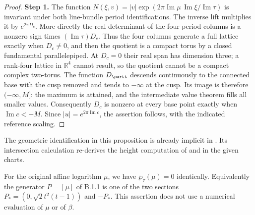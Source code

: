 \begin{proof}
\par\smallskip\noindent\textbf{Step 1.} The function $N(\xi,v)=|v|\exp(2\pi\operatorname{Im}\mu\,\operatorname{Im}\xi/\operatorname{Im}\tau)$ is invariant under both line-bundle period identifications. The inverse lift multiplies it by $e^{2\pi D_c}$. More directly the real determinant of the four period columns is a nonzero sign times $(\operatorname{Im}\tau)D_c$. Thus the four columns generate a full lattice exactly when $D_c\ne0$, and then the quotient is a compact torus by a closed fundamental parallelepiped. At $D_c=0$ their real span has dimension three; a rank-four lattice in $\mathbb R^4$ cannot result, so the quotient cannot be a compact complex two-torus. The function $D_{\partt}$ descends continuously to the connected base with the cusp removed and tends to $-\infty$ at the cusp. Its image is therefore $(-\infty,M]$: the maximum is attained, and the intermediate value theorem fills all smaller values. Consequently $D_c$ is nonzero at every base point exactly when $\operatorname{Im}c<-M$. Since $|u|=e^{2\pi\operatorname{Im}c}$, the assertion follows, with the indicated reference scaling.
\end{proof}
The geometric identification in this proposition is already implicit in \cite[Remark 3.12]{AC26}. Its intersection calculation re-derives the height computation of \cite[Main Theorem, entry 49; (3.2)]{OS91} and \cite[Theorem 8.6; (8.16)]{Shi90} in the given charts.
\begin{proposition}[FAM B.1.3; T]\label{fam:B.1.3}
For the original affine logarithm $\mu$, we have $\wp_\tau(\mu)=0$ identically. Equivalently the generator $P=[\mu]$ of B.1.1 is one of the two sections $P_*=(0,\sqrt2t^2(t-1))$ and $-P_*$. This assertion does not use a numerical evaluation of $\mu$ or of $\beta$.
\end{proposition}
